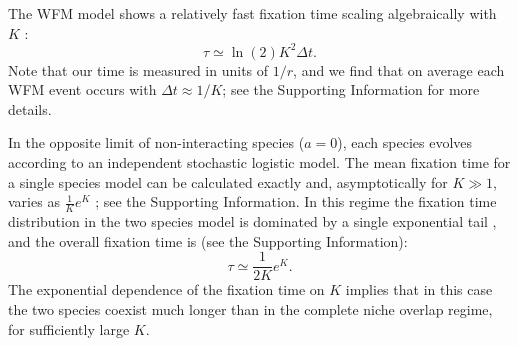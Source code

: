 \documentclass[a4paper,10pt]{article}
\numberwithin{equation}{section} %
\begin{document}
The WFM model shows a relatively fast fixation time scaling algebraically with $K$ \cite{Moran1962,Lin2012}:%
\begin{equation} \label{morantime}
\tau \simeq \ln(2) K^2 \Delta t.
\end{equation}
Note that our time is measured in units of $1/r$, and we find that on average each WFM event occurs with $\Delta t \approx 1/K$; see the Supporting Information for more details.

In the opposite limit of non-interacting species ($a=0$), each species evolves according to an independent stochastic logistic model.
The mean fixation time for a single species model can be calculated exactly and, asymptotically for $K\gg 1$, varies as $\frac{1}{K} e^K$ \cite{Lande1993,Nisbet1982}; see the Supporting Information. %
In this regime the fixation time distribution in the two species model is dominated by a single exponential tail \cite{Norden1982,Hanggi1990,Ovaskainen2010}, and the overall fixation time is (see the Supporting Information):
\begin{equation} \label{indietime}
 \tau \simeq \frac{1}{2K} e^K.
\end{equation}
The exponential dependence of the fixation time on $K$ implies that in this case the two species coexist much longer than in the complete niche overlap regime, for sufficiently large $K$.
\end{document}
